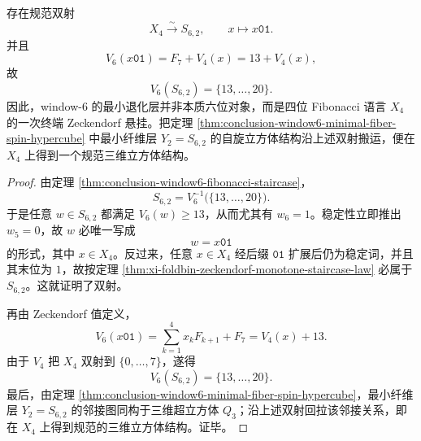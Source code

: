 \begin{theorem}[最小台阶的分辨率下降与自旋立方体下沉]\label{thm:conclusion-window6-minimal-step-suffix-suspension}
存在规范双射
\[
X_4\xrightarrow{\ \sim\ }S_{6,2},
\qquad
x\longmapsto x\mathtt{01}.
\]
并且
\[
V_6(x\mathtt{01})=F_7+V_4(x)=13+V_4(x),
\]
故
\[
V_6(S_{6,2})=\{13,\dots,20\}.
\]
因此，window-\(6\) 的最小退化层并非本质六位对象，而是四位 Fibonacci 语言 \(X_4\) 的一次终端 Zeckendorf 悬挂。把定理 \ref{thm:conclusion-window6-minimal-fiber-spin-hypercube} 中最小纤维层 \(Y_2=S_{6,2}\) 的自旋立方体结构沿上述双射搬运，便在 \(X_4\) 上得到一个规范三维立方体结构。
\end{theorem}
\begin{proof}
由定理 \ref{thm:conclusion-window6-fibonacci-staircase}，
\[
S_{6,2}=V_6^{-1}\!\bigl(\{13,\dots,20\}\bigr).
\]
于是任意 \(w\in S_{6,2}\) 都满足 \(V_6(w)\ge 13\)，从而尤其有 \(w_6=1\)。稳定性立即推出 \(w_5=0\)，故 \(w\) 必唯一写成
\[
w=x\mathtt{01}
\]
的形式，其中 \(x\in X_4\)。反过来，任意 \(x\in X_4\) 经后缀 \(\mathtt{01}\) 扩展后仍为稳定词，并且其末位为 \(1\)，故按定理 \ref{thm:xi-foldbin-zeckendorf-monotone-staircase-law} 必属于 \(S_{6,2}\)。这就证明了双射。

再由 Zeckendorf 值定义，
\[
V_6(x\mathtt{01})
=
\sum_{k=1}^{4}x_kF_{k+1}+F_7
=
V_4(x)+13.
\]
由于 \(V_4\) 把 \(X_4\) 双射到 \(\{0,\dots,7\}\)，遂得
\[
V_6(S_{6,2})=\{13,\dots,20\}.
\]
最后，由定理 \ref{thm:conclusion-window6-minimal-fiber-spin-hypercube}，最小纤维层 \(Y_2=S_{6,2}\) 的邻接图同构于三维超立方体 \(Q_3\)；沿上述双射回拉该邻接关系，即在 \(X_4\) 上得到规范的三维立方体结构。证毕。
\end{proof}

